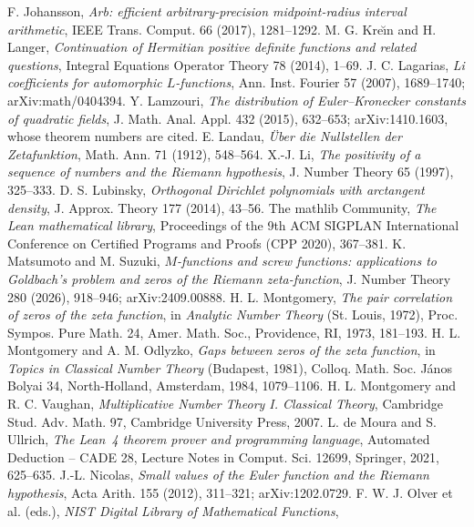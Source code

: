  F. Johansson, \emph{Arb: efficient arbitrary-precision midpoint-radius interval arithmetic}, IEEE Trans.
  Comput. 66 (2017), 1281--1292.
 M. G. Kre\u{\i}n and H. Langer, \emph{Continuation of Hermitian positive definite functions and
  related questions}, Integral Equations Operator Theory 78 (2014), 1--69.
 J. C. Lagarias, \emph{Li coefficients for automorphic $L$-functions}, Ann. Inst. Fourier 57
  (2007), 1689--1740; arXiv:math/0404394.
 Y. Lamzouri, \emph{The distribution of Euler--Kronecker constants of quadratic fields}, J. Math.
  Anal. Appl. 432 (2015), 632--653; arXiv:1410.1603, whose theorem numbers are cited.
 E. Landau, \emph{\"Uber die Nullstellen der Zetafunktion}, Math. Ann. 71 (1912), 548--564.
 X.-J. Li, \emph{The positivity of a sequence of numbers and the Riemann hypothesis}, J. Number Theory 65
  (1997), 325--333.
 D. S. Lubinsky, \emph{Orthogonal Dirichlet polynomials with arctangent density}, J. Approx.
  Theory 177 (2014), 43--56.
 The mathlib Community, \emph{The Lean mathematical library}, Proceedings of the 9th ACM SIGPLAN
  International Conference on Certified Programs and Proofs (CPP 2020), 367--381.
 K. Matsumoto and M. Suzuki, \emph{$M$-functions and screw functions: applications to
  Goldbach's problem and zeros of the Riemann zeta-function}, J. Number Theory 280 (2026), 918--946;
  arXiv:2409.00888.
 H. L. Montgomery, \emph{The pair correlation of zeros of the zeta function}, in \emph{Analytic
  Number Theory} (St. Louis, 1972), Proc. Sympos. Pure Math. 24, Amer. Math. Soc., Providence, RI, 1973, 181--193.
 H. L. Montgomery and A. M. Odlyzko, \emph{Gaps between zeros of the zeta function}, in
  \emph{Topics in Classical Number Theory} (Budapest, 1981), Colloq. Math. Soc. J\'anos Bolyai 34, North-Holland,
  Amsterdam, 1984, 1079--1106.
 H. L. Montgomery and R. C. Vaughan, \emph{Multiplicative Number Theory I. Classical
Theory},   Cambridge Stud. Adv. Math. 97, Cambridge University Press, 2007.
 L. de Moura and S. Ullrich, \emph{The Lean~4 theorem prover and programming language}, Automated
  Deduction -- CADE 28, Lecture Notes in Comput. Sci. 12699, Springer, 2021, 625--635.
 J.-L. Nicolas, \emph{Small values of the Euler function and the Riemann hypothesis}, Acta Arith. 155
  (2012), 311--321; arXiv:1202.0729.
 F. W. J. Olver et al. (eds.), \emph{NIST Digital Library of Mathematical Functions},
